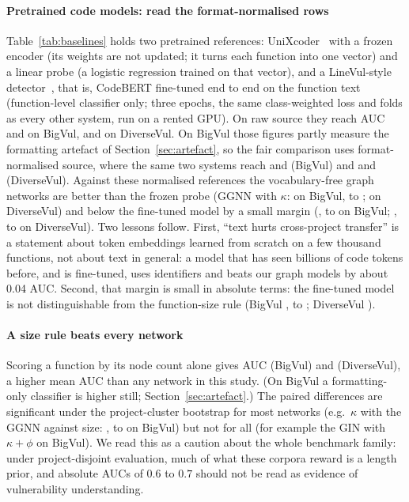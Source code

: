 \paragraph{Pretrained code models: read the format-normalised rows} Table~\ref{tab:baselines}
holds two pretrained references: UniXcoder~\cite{guo2022unixcoder} with a frozen
encoder (its weights are not updated; it turns each function into one vector) and
a linear probe (a logistic regression trained on that vector), and a
LineVul-style detector~\cite{fu2022linevul}, that is, CodeBERT fine-tuned
end to end on the function text (function-level classifier only; three epochs,
the same class-weighted loss and folds as every other system, run on a rented
GPU). On raw source they reach AUC \numbvUnixAuc{} and \rBvLinevulAuc{} on BigVul,
\numdvUnixAuc{} and \rDvLinevulAuc{} on DiverseVul. On BigVul those figures partly
measure the formatting artefact of Section~\ref{sec:artefact}, so the fair
comparison uses format-normalised source, where the same two systems reach
\rBvUnixNormAuc{} and \rBvLinevulNormAuc{} (BigVul) and \rDvUnixNormAuc{} and
\rDvLinevulNormAuc{} (DiverseVul). Against these normalised references the
vocabulary-free graph networks are better than the frozen probe (GGNN with
$\kappa$: \cBvGgnnKindVUnixNormD{} on BigVul, \cBvGgnnKindVUnixNormLo{} to
\cBvGgnnKindVUnixNormHi{}; \cDvGgnnKindVUnixNormD{} on DiverseVul) and below the
fine-tuned model by a small margin (\cBvGgnnKindVLinevulNormD{},
\cBvGgnnKindVLinevulNormLo{} to \cBvGgnnKindVLinevulNormHi{} on BigVul;
\cDvGgnnKindVLinevulNormD{}, \cDvGgnnKindVLinevulNormLo{} to
\cDvGgnnKindVLinevulNormHi{} on DiverseVul). Two lessons follow. First, ``text
hurts cross-project transfer'' is a statement about token embeddings learned
from scratch on a few thousand functions, not about text in general: a model that
has seen billions of code tokens before, and is fine-tuned, uses identifiers and
beats our graph models by about 0.04 AUC. Second, that margin is small in
absolute terms: the fine-tuned model is not distinguishable from the
function-size rule (BigVul \xBvLinevulNormVSizeD{}, \xBvLinevulNormVSizeLo{} to
\xBvLinevulNormVSizeHi{}; DiverseVul \xDvLinevulNormVSizeD{}).

\paragraph{A size rule beats every network} Scoring a function by its node
count alone gives AUC \numbvSizeAuc{} (BigVul) and \numdvSizeAuc{} (DiverseVul),
a higher mean AUC than any network in this study. (On BigVul a formatting-only
classifier is higher still; Section~\ref{sec:artefact}.) The paired differences are significant under
the project-cluster bootstrap for most networks (e.g.\ $\kappa$ with the GGNN
against size: \cBvGgnnKindVSizeD{}, \cBvGgnnKindVSizeLo{} to
\cBvGgnnKindVSizeHi{} on BigVul) but not for all (for example the GIN with
$\kappa{+}\phi$ on BigVul). We read this as a caution about the whole
benchmark family: under project-disjoint evaluation, much of what these
corpora reward is a length prior, and absolute AUCs of $0.6$ to $0.7$ should not
be read as evidence of vulnerability understanding.

